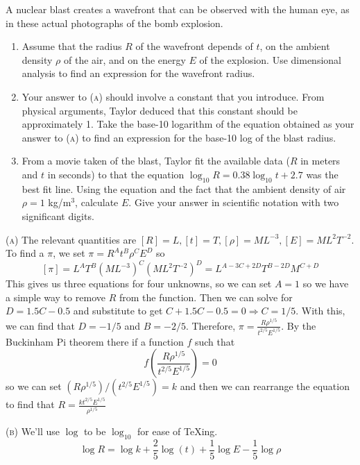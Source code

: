 \documentclass[11pt,answers]{exam}
\begin{document}
\begin{questions}
\item A nuclear blast creates a wavefront that can be observed with the human eye, as in these actual photographs of the bomb explosion.
\begin{enumerate}
\item Assume that the radius $R$ of the wavefront depends of $t$, on the ambient density $\rho$ of the air, and on the energy $E$ of the explosion.  Use dimensional analysis to find an expression for the wavefront radius.
\item Your answer to \textsc{(a)} should involve a constant that you introduce.  From physical arguments, Taylor deduced that this constant should be approximately 1.  Take the base-10 logarithm of the equation obtained as your answer to \textsc{(a)} to find an expression for the base-10 log of the blast radius.
\item From a movie taken of the blast, Taylor fit the available data ($R$ in meters and $t$ in seconds) to that the equation $\log_{10}R = 0.38\log_{10}t + 2.7$ was the best fit line.  Using the equation and the fact that the ambient density of air $\rho = 1$ kg/m$^3$, calculate $E$.  Give your answer in scientific notation with two significant digits.
\end{enumerate}
\begin{solution}
\newline\textsc{(a)}
The relevant quantities are $[R] = L, [t] = T, [\rho] = ML^{-3}, [E] = ML^2T^{-2}$.  To find a $\pi$, we set $\pi = R^A t^B \rho^C E^D$ so
\[
[\pi] = L^AT^B(ML^{-3})^C(ML^2T^{-2})^D = L^{A - 3C + 2D}T^{B-2D}M^{C+D}
\]
This gives us three equations for four unknowns, so we can set $A = 1$ so we have a simple way to remove $R$ from the function.  Then we can solve for $D = 1.5C - 0.5$ and substitute to get  $C + 1.5C - 0.5 = 0 \Rightarrow C = 1/5$.  With this, we can find that $D = -1/5$ and $B = -2/5$.  Therefore, $\displaystyle \pi = \frac{R\rho^{1/5}}{t^{2/5}E^{1/5}}$.  By the Buckinham Pi theorem there if a function $f$ such that
\[
f\left(\frac{R\rho^{1/5}}{t^{2/5}E^{1/5}}\right) = 0
\]
so we can set $(R\rho^{1/5})/(t^{2/5}E^{1/5}) = k$ and then we can rearrange the equation to find that $\displaystyle R = \frac{kt^{2/5}E^{1/5}}{\rho^{1/5}}$

\vspace{1em}

\textsc{(b)} We'll use $\log$ to be $\log_{10}$ for ease of TeXing.
\[
\log{R} = \log{k} + \frac{2}{5}\log(t) + \frac{1}{5}\log{E} - \frac{1}{5}\log{\rho}
\]


\end{solution}
\end{questions}
\end{document}
